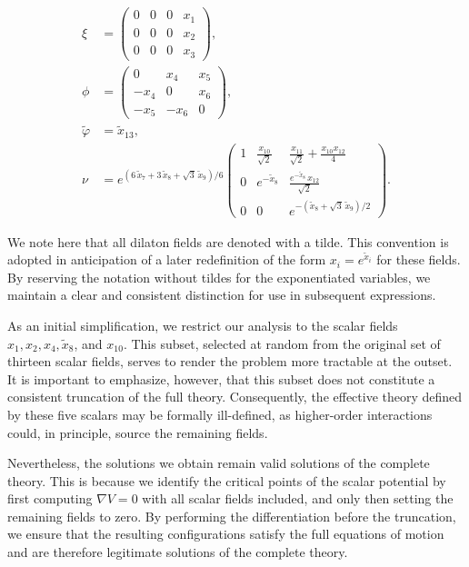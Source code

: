 \documentclass[11pt]{article}
\begin{document}
\begin{equation}
	\begin{aligned}
		\xi &= \begin{pmatrix}
					0 & 0 & 0 & x_{1} \\
					0 & 0 & 0 & x_{2} \\
					0 & 0 & 0 & x_{3}
				\end{pmatrix}, \\[5pt]
		\phi &= \begin{pmatrix}
					0 & x_{4} & x_{5} \\
					-x_{4} & 0 & x_{6} \\
					-x_{5} & -x_{6} & 0
				\end{pmatrix}, \\[5pt]
		\tilde{\varphi} &= \tilde{x}_{13}, \\[5pt]
		\nu &= e^{(6\,\tilde{x}_{7}+3\,\tilde{x}_{8}+\sqrt{3}\,\tilde{x}_{9})/6}
				\begin{pmatrix}
					1 & \frac{x_{10}}{\sqrt{2}} & \frac{x_{11}}{\sqrt{2}} + \frac{x_{10}x_{12}}{4} \\
					0 & e^{-\tilde{x}_{8}} & \frac{e^{-\tilde{x}_{8}}\,x_{12}}{\sqrt{2}} \\
					0 & 0 & e^{-(\tilde{x}_{8}+\sqrt{3}\,\tilde{x}_{9})/2}
				\end{pmatrix}.
	\end{aligned}
\end{equation}

We note here that all dilaton fields are denoted with a tilde. This convention is adopted in anticipation of a later redefinition of the form \( x_i = e^{\tilde{x}_i} \) for these fields. By reserving the notation without tildes for the exponentiated variables, we maintain a clear and consistent distinction for use in subsequent expressions.

As an initial simplification, we restrict our analysis to the scalar fields $x_{1}, x_{2}, x_{4}, \tilde{x}_{8}$, and $x_{10}$. This subset, selected at random from the original set of thirteen scalar fields, serves to render the problem more tractable at the outset. It is important to emphasize, however, that this subset does not constitute a consistent truncation of the full theory. Consequently, the effective theory defined by these five scalars may be formally ill-defined, as higher-order interactions could, in principle, source the remaining fields.

Nevertheless, the solutions we obtain remain valid solutions of the complete theory. This is because we identify the critical points of the scalar potential by first computing $\nabla V = 0$ with all scalar fields included, and only then setting the remaining fields to zero. By performing the differentiation before the truncation, we ensure that the resulting configurations satisfy the full equations of motion and are therefore legitimate solutions of the complete theory.
\end{document}
